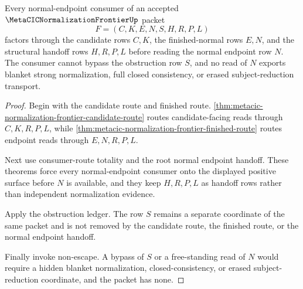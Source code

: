 \begin{theorem}
\label{thm:metacic-normalization-frontier-normal-endpoint-exhaustion}
Every normal-endpoint consumer of an accepted $\MetaCICNormalizationFrontierUp$
packet
$$
F=(C,K,E,N,S,H,R,P,L)
$$
factors through the candidate rows $C,K$, the finished-normal rows $E,N$, and
the structural handoff rows $H,R,P,L$ before reading the normal endpoint row
$N$. The consumer cannot bypass the obstruction row $S$, and no read of $N$
exports blanket strong normalization, full closed consistency, or erased
subject-reduction transport.
\end{theorem}
\begin{proof}
Begin with the candidate route and finished route.
\autoref{thm:metacic-normalization-frontier-candidate-route} routes
candidate-facing reads through $C,K,R,P,L$, while
\autoref{thm:metacic-normalization-frontier-finished-route} routes endpoint
reads through $E,N,R,P,L$.

Next use consumer-route totality and the root normal endpoint handoff. These
theorems force every normal-endpoint consumer onto the displayed positive
surface before $N$ is available, and they keep $H,R,P,L$ as handoff rows rather
than independent normalization evidence.

Apply the obstruction ledger. The row $S$ remains a separate coordinate of the
same packet and is not removed by the candidate route, the finished route, or
the normal endpoint handoff.

Finally invoke non-escape. A bypass of $S$ or a free-standing read of $N$ would
require a hidden blanket normalization, closed-consistency, or erased
subject-reduction coordinate, and the packet has none.
\end{proof}

